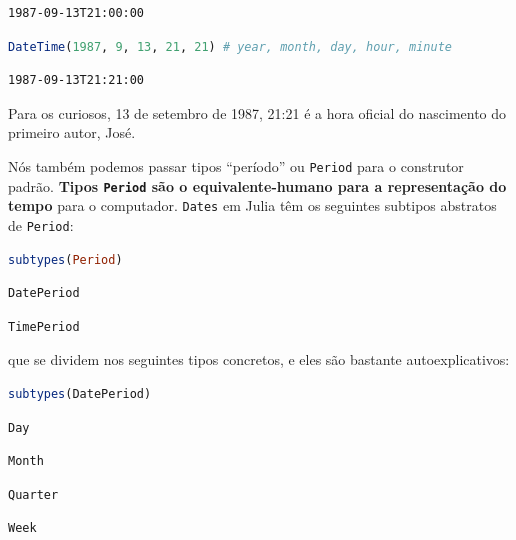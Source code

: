 \documentclass[
  notoc %
]{tufte-book}
\newcommand{\passthrough}[1]{#1}
\begin{document}
\begin{lstlisting}[language=Output]
1987-09-13T21:00:00
\end{lstlisting}

\begin{lstlisting}[language=Julia]
DateTime(1987, 9, 13, 21, 21) # year, month, day, hour, minute
\end{lstlisting}

\begin{lstlisting}[language=Output]
1987-09-13T21:21:00
\end{lstlisting}

Para os curiosos, 13 de setembro de 1987, 21:21 é a hora oficial do
nascimento do primeiro autor, José.

Nós também podemos passar tipos ``período'' ou
\passthrough{\lstinline!Period!} para o construtor padrão. \textbf{Tipos
\passthrough{\lstinline!Period!} são o equivalente-humano para a
representação do tempo} para o computador.
\passthrough{\lstinline!Dates!} em Julia têm os seguintes subtipos
abstratos de \passthrough{\lstinline!Period!}:

\begin{lstlisting}[language=Julia]
subtypes(Period)
\end{lstlisting}

\begin{lstlisting}[language=Output]
DatePeriod
\end{lstlisting}

\begin{lstlisting}[language=Output]
TimePeriod
\end{lstlisting}

que se dividem nos seguintes tipos concretos, e eles são bastante
autoexplicativos:

\begin{lstlisting}[language=Julia]
subtypes(DatePeriod)
\end{lstlisting}

\begin{lstlisting}[language=Output]
Day
\end{lstlisting}

\begin{lstlisting}[language=Output]
Month
\end{lstlisting}

\begin{lstlisting}[language=Output]
Quarter
\end{lstlisting}

\begin{lstlisting}[language=Output]
Week
\end{lstlisting}
\end{document}

